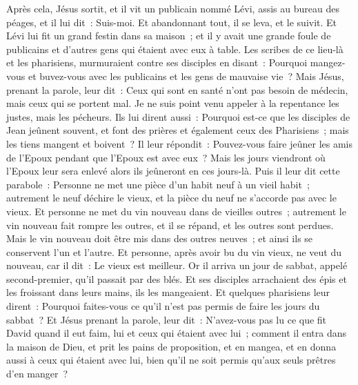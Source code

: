 \begin{multicols}{2}
Après cela, Jésus sortit, et il vit un publicain nommé Lévi, assis au bureau des péages, et il lui dit~: Suis-moi.
Et abandonnant tout, il se leva, et le suivit.
Et Lévi lui fit un grand festin dans sa maison~; et il y avait une grande foule de publicains et d'autres gens qui étaient avec eux à table.
Les scribes de ce lieu-là et les pharisiens, murmuraient contre ses disciples en disant~: Pourquoi mangez-vous et buvez-vous avec les publicains et les gens de mauvaise vie~?
Mais Jésus, prenant la parole, leur dit~: Ceux qui sont en santé n'ont pas besoin de médecin, mais ceux qui se portent mal.
Je ne suis point venu appeler à la repentance les justes, mais les pécheurs.
Ils lui dirent aussi~: Pourquoi est-ce que les disciples de Jean jeûnent souvent, et font des prières et également ceux des Pharisiens~; mais les tiens mangent et boivent~?
Il leur répondit~: Pouvez-vous faire jeûner les amis de l'Epoux pendant que l'Epoux est avec eux~?
Mais les jours viendront où l'Epoux leur sera enlevé alors ils jeûneront en ces jours-là.
Puis il leur dit cette parabole~: Personne ne met une pièce d'un habit neuf à un vieil habit~; autrement le neuf déchire le vieux, et la pièce du neuf ne s'accorde pas avec le vieux.
Et personne ne met du vin nouveau dans de vieilles outres~; autrement le vin nouveau fait rompre les outres, et il se répand, et les outres sont perdues.
Mais le vin nouveau doit être mis dans des outres neuves~; et ainsi ils se conservent l'un et l'autre.
Et personne, après avoir bu du vin vieux, ne veut du nouveau, car il dit~: Le vieux est meilleur.
\VerseOne{}Or il arriva un jour de sabbat, appelé second-premier, qu'il passait par des blés. Et ses disciples arrachaient des épis et les froissant dans leurs mains, ils les mangeaient.
Et quelques pharisiens leur dirent~: Pourquoi faites-vous ce qu'il n'est pas permis de faire les jours du sabbat~?
Et Jésus prenant la parole, leur dit~: N'avez-vous pas lu ce que fit David quand il eut faim, lui et ceux qui étaient avec lui~;
comment il entra dans la maison de Dieu, et prit les pains de proposition, et en mangea, et en donna aussi à ceux qui étaient avec lui, bien qu'il ne soit permis qu'aux seuls prêtres d'en manger~?

\end{multicols}
